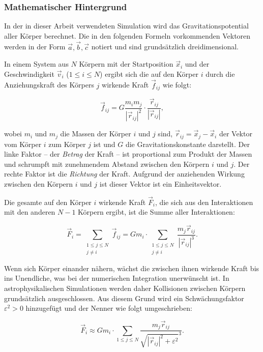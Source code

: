 \subsubsection{Mathematischer Hintergrund}
\label{methoden:nbody:mathematik}

In der in dieser Arbeit verwendeten Simulation wird das Gravitationspotential
aller Körper berechnet. Die in den folgenden Formeln vorkommenden Vektoren
werden in der Form $\vec{a}, \vec{b}, \vec{c}$ notiert und sind grundsätzlich
dreidimensional.

In einem System aus $N$ Körpern mit der Startposition $\vec{x}_i$ und der
Geschwindigkeit $\vec{v}_i$ ($1 \leq i \leq N$) ergibt sich die auf den Körper
$i$ durch die Anziehungskraft des Körpers $j$ wirkende Kraft $\vec{f}_{ij}$ wie
folgt:

\[
    \vec{f}_{ij} = G \frac{m_i m_j}{|\vec{r}_{ij}|^2} \cdot
                   \frac{\vec{r}_{ij}}{|\vec{r}_{ij}|},
\]

wobei $m_i$ und $m_j$ die Massen der Körper $i$ und $j$ sind,
$\vec{r}_{ij} = \vec{x}_j - \vec{x}_i$ der Vektor vom Körper $i$ zum Körper $j$
ist und $G$ die Gravitationskonstante darstellt. Der linke Faktor -- der
\textit{Betrag} der Kraft -- ist proportional zum Produkt der Massen und
schrumpft mit zunehmendem Abstand zwischen den Körpern $i$ und $j$. Der rechte
Faktor ist die \textit{Richtung} der Kraft. Aufgrund der anziehenden Wirkung
zwischen den Körpern $i$ und $j$ ist dieser Vektor ist ein Einheitsvektor.

Die gesamte auf den Körper $i$ wirkende Kraft $\vec{F}_i$, die sich aus den
Interaktionen mit den anderen $N - 1$ Körpern ergibt, ist die Summe aller
Interaktionen:

\[
    \vec{F}_i = \sum\limits_{\substack{1 \leq j \leq N\\ j \neq i}} \vec{f}_{ij}
              = G m_i \cdot \sum\limits_{\substack{1 \leq j \leq N\\j \neq i}}
                \frac{m_j \vec{r}_{ij}}{|\vec{r}_{ij}|^3}.
\]

Wenn sich Körper einander nähern, wächst die zwischen ihnen wirkende Kraft bis
ins Unendliche, was bei der numerischen Integration unerwünscht ist. In
astrophysikalischen Simulationen werden daher Kollisionen zwischen Körpern
grundsätzlich ausgeschlossen. Aus diesem Grund wird ein Schwächungsfaktor
$\varepsilon^2 > 0$ hinzugefügt und der Nenner wie folgt umgeschrieben:

\[
    \vec{F}_i \approx G m_i \cdot \sum\limits_{1 \leq j \leq N}
                      \frac{m_j \vec{r}_{ij}}
                           {\sqrt{|\vec{r}_{ij}|^2 + \varepsilon^2}^3}.
\]

